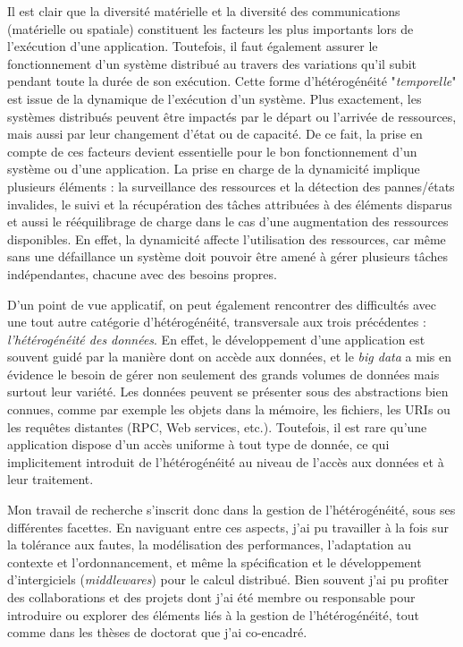 Il est clair que la diversité matérielle et la diversité des communications (matérielle ou spatiale) constituent les facteurs les plus importants lors de l'exécution d'une application. Toutefois, il faut également assurer le fonctionnement d'un système distribué au travers des variations qu'il subit pendant toute la durée de son exécution. Cette forme d'hétérogénéité "\textit{temporelle}" est issue de la dynamique de l'exécution d'un système. Plus exactement, les systèmes distribués peuvent être impactés par le départ ou l'arrivée de ressources, mais aussi par leur changement d'état ou de capacité. De ce fait, la prise en compte de ces facteurs devient essentielle pour le bon fonctionnement d'un système ou d'une application. La prise en charge de la dynamicité implique plusieurs éléments : la surveillance des ressources et la détection des pannes/états invalides, le suivi et la récupération des tâches attribuées à des éléments disparus et aussi le rééquilibrage de charge dans le cas d'une augmentation des ressources disponibles. En effet, la dynamicité affecte l'utilisation des ressources, car même sans une défaillance un système doit pouvoir être amené à gérer plusieurs tâches indépendantes, chacune avec des besoins propres.

D'un point de vue applicatif, on peut également rencontrer des difficultés avec une tout autre catégorie d'hétérogénéité, transversale aux trois précédentes : \textit{l'hétérogénéité des données}. En effet, le développement d'une application est souvent guidé par la manière dont on accède aux données, et le \textit{big data} a mis en évidence le besoin de gérer non seulement des grands volumes de données mais surtout leur variété. Les données peuvent se présenter sous des abstractions bien connues, comme par exemple les objets dans la mémoire, les fichiers, les URIs ou les requêtes distantes (RPC, Web services, etc.). Toutefois, il est rare qu'une application dispose d'un accès uniforme à tout type de donnée, ce qui implicitement introduit de l'hétérogénéité au niveau de l'accès aux données et à leur traitement. 

Mon travail de recherche s'inscrit donc dans la gestion de l'hétérogénéité, sous ses différentes facettes. En naviguant entre ces aspects, j'ai pu travailler à la fois sur la tolérance aux fautes, la modélisation des performances, l'adaptation au contexte et l'ordonnancement, et même la spécification et le développement d'intergiciels (\textit{middlewares}) pour le calcul distribué. Bien souvent j'ai pu profiter des collaborations et des projets dont j'ai été membre ou responsable pour introduire ou explorer des éléments liés à la gestion de l'hétérogénéité, tout comme dans les thèses de doctorat que j'ai co-encadré. 

